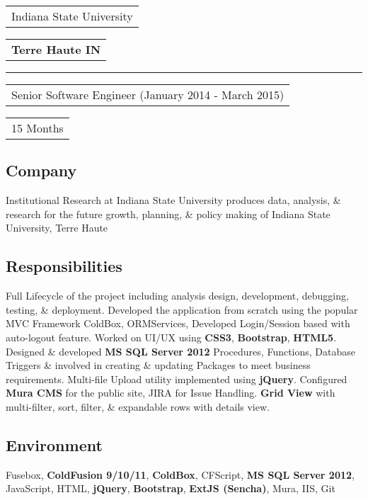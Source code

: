 \documentclass[letterpaper,10pt]{article}
\begin{document}

    \noindent
    \begin{tabular}[t]{@{}l}
    \Large{Indiana State University}
    \end{tabular}
    \hfill
    \begin{tabular}[t]{l@{}}
    \textbf{Terre Haute IN}
    \end{tabular}
    \noindent\rule{\textwidth}{0.5pt}
    \begin{tabular}[t]{@{}l}
    Senior Software Engineer (January 2014 - March 2015)
    \end{tabular}
    \hfill
    \begin{tabular}[t]{l@{}}
    15 Months
    \end{tabular}

    \subsection{Company}
    Institutional Research at Indiana State University produces data, analysis, \& research for the future growth, planning, \& policy making of Indiana State University, Terre Haute

    \subsection{Responsibilities}
    Full Lifecycle of the project including analysis design, development, debugging, testing, \& deployment. Developed the application from scratch using the popular MVC Framework ColdBox, ORMServices, Developed Login/Session based with auto-logout feature. Worked on UI/UX using \textbf{CSS3}, \textbf{Bootstrap}, \textbf{HTML5}. Designed \& developed \textbf{MS SQL Server 2012} Procedures, Functions, Database Triggers \& involved in creating \& updating Packages to meet business requirements. Multi-file Upload utility implemented using \textbf{jQuery}. Configured \textbf{Mura CMS} for the public site, JIRA for Issue Handling. \textbf{Grid View} with multi-filter, sort, filter, \& expandable rows with details view.

    \subsection{Environment}
    Fusebox, \textbf{ColdFusion 9/10/11}, \textbf{ColdBox}, CFScript, \textbf{MS SQL Server 2012}, JavaScript, HTML, \textbf{jQuery}, \textbf{Bootstrap}, \textbf{ExtJS (Sencha)}, Mura, IIS, Git
\end{document}
